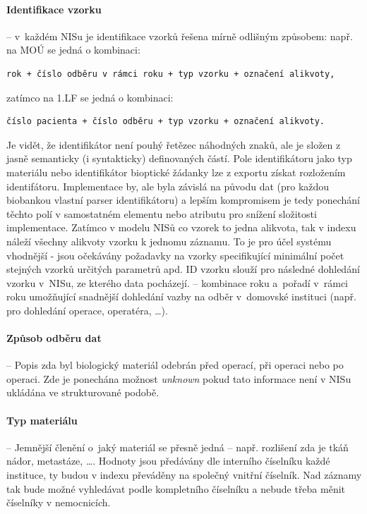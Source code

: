 \paragraph*{Identifikace vzorku}
			\begin{itemize}
				 -- v~každém NISu je identifikace vzorků řešena mírně odlišným způsobem: např. na MOÚ se jedná o kombinaci:
				\begin{verbatim}rok + číslo odběru v rámci roku + typ vzorku + označení alikvoty,\end{verbatim}zatímco na 1.LF se jedná o kombinaci:
				\begin{verbatim}číslo pacienta + číslo odběru + typ vzorku + označení alikvoty.\end{verbatim}Je vidět, že identifikátor není pouhý řetězec náhodných znaků, ale je složen z jasně semanticky (i syntakticky) definovaných částí. Pole identifikátoru jako typ materiálu nebo identifikátor bioptické žádanky lze z exportu získat rozložením identifátoru. Implementace by, ale byla závislá na původu dat (pro každou biobankou vlastní parser identifikátoru) a lepším kompromisem je tedy ponechání těchto polí v samostatném elementu nebo atributu pro snížení složitosti implementace.
				Zatímco v modelu NISů co vzorek to jedna alikvota, tak v indexu náleží všechny alikvoty vzorku k jednomu záznamu. To je pro účel systému vhodnější - jsou očekávány požadavky na vzorky specifikující minimální počet stejných vzorků určitých parametrů apd.
				ID vzorku slouží pro následné dohledání vzorku v~NISu, ze kterého data pocházejí.
				 -- kombinace roku a~pořadí v~rámci roku umožňující snadnější dohledání vazby na odběr v~domovské instituci (např. pro dohledání operace, operatéra, \dots).
			\end{itemize}			
 \paragraph*{Způsob odběru dat} --						
	Popis zda byl biologický materiál odebrán před operací, při operaci nebo po operaci. Zde je ponechána možnost \textit{unknown} pokud tato informace není v NISu ukládána ve strukturované podobě.
		
\paragraph*{Typ materiálu}	--
Jemnější členění o~jaký materiál se přesně jedná -- např. rozlišení zda je tkáň nádor, metastáze, \dots . Hodnoty jsou předávány dle interního číselníku každé instituce, ty budou v indexu převáděny na společný vnitřní číselník. Nad záznamy tak bude možné vyhledávat podle kompletního číselníku a nebude třeba měnit číselníky v nemocnicích. 
		
